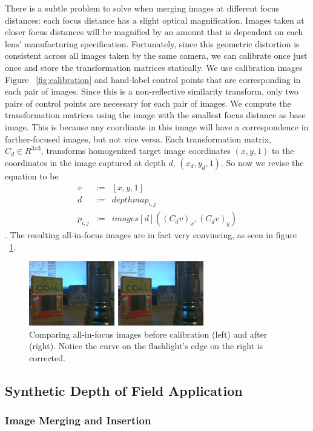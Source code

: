 \documentclass[annual]{acmsiggraph}
\begin{document}
There is a subtle problem to solve when merging images at different focus distances: each focus distance has a slight optical magnification.  Images taken at closer focus distances will be magnified by an amount that is dependent on each lens' manufacturing specification.  Fortunately, since this geometric distortion is consistent across all images taken by the same camera, we can calibrate once just once and store the transformation matrices statically. We use calibration images Figure ~\ref{fig:calibration} and hand-label control points that are corresponding in each pair of images. Since this is a non-reflective similarity transform, only two pairs of control points are necessary for each pair of images.  We compute the transformation matrices using the image with the smallest focus distance as base image.  This is because any coordinate in this image will have a correspondence in farther-focused images, but not vice versa.  Each transformation matrix, $C_d\in R^{3x3}$, transforms homogenized target image coordinates $(x,y,1)$ to the coordinates in the image captured at depth $d$, $(x_d,y_d,1)$. So now we revise the equation to be
\begin{eqnarray} 
v &:=& [x,y,1] \nonumber \\
d &:=& depthmap_{i,j}  \nonumber \\
p_{i,j} &:=& images[ d ]( (C_d v)_x, (C_d v)_y)
\end{eqnarray}. The resulting all-in-focus images are in fact very convincing, as seen in figure ~\ref{fig:all-focus-calibrated}.

\begin{figure}
\centering
\includegraphics[width=3in]{images/all-focus-calibrated.jpg}
\caption{Comparing all-in-focus images before calibration (left) and after (right). Notice the curve on the flashlight's edge on the right is corrected.}
\label{fig:all-focus-calibrated}
\end{figure}


\subsection{Synthetic Depth of Field Application}
\subsubsection{Image Merging and Insertion}
\end{document}
